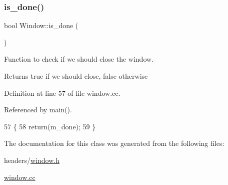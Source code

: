 \subsubsection{\texorpdfstring{is\+\_\+done()}{is\_done()}}
{\footnotesize\ttfamily bool Window\+::is\+\_\+done (\begin{DoxyParamCaption}{ }\end{DoxyParamCaption})}



Function to check if we should close the window. 

\begin{DoxyReturn}{Returns}
true if we should close, false otherwise 
\end{DoxyReturn}


Definition at line 57 of file window.\+cc.



Referenced by main().


\begin{DoxyCode}
57                      \{
58     \textcolor{keywordflow}{return}(m\_done);
59 \}
\end{DoxyCode}


The documentation for this class was generated from the following files\+:\begin{DoxyCompactItemize}
\item 
headers/\hyperlink{window_8h}{window.\+h}\item 
\hyperlink{window_8cc}{window.\+cc}\end{DoxyCompactItemize}
